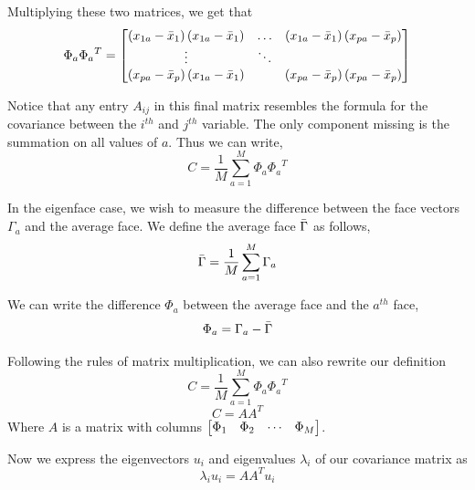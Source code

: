 \documentclass[12pt]{report}
\begin{document}
\begin{myproof}
                Multiplying these two matrices, we get that
                    \[
                        \Phi_a {\Phi_a}^T = \begin{bmatrix}
                            \left(x_{1a} - \bar{x}_1\right)\left(x_{1a} - \bar{x}_1\right) & \dotsc & \left(x_{1a} - \bar{x}_1\right) \left(x_{pa} - \bar{x}_p\right) \\
                            \vdots & \ddots & \\
                            \left(x_{pa} - \bar{x}_p\right) \left(x_{1a} - \bar{x}_1\right) & & \left(x_{pa} - \bar{x}_p\right) \left(x_{pa} - \bar{x}_p\right)
                        \end{bmatrix}
                    \]
               
                    Notice that any entry $A_{ij}$ in this final matrix resembles the formula for the covariance between the $i^{th}$ and $j^{th}$ variable. The only component missing is the summation on all values of $a$. Thus we can write,
                    \[
                        C = \frac{1}{M} \sum_{a=1}^M \Phi_a {\Phi_a}^T
                    \]
            \end{myproof}


            In the eigenface case, we wish to measure the difference between the face vectors $\Gamma_a$ and the average face. We define the average face $\bar{\Gamma}$ as follows,
                \[
                    \bar{\Gamma} = \frac{1}{M} \sum_{a=1}^M \Gamma_a
                \]

            We can write the difference $\Phi_a$ between the average face and the $a^{th}$ face,
                \[
                    \Phi_a = \Gamma_a - \bar{\Gamma}
                \]

            
            Following the rules of matrix multiplication, we can also rewrite our definition
                \[
                    C = \frac{1}{M} \sum_{a=1}^M \Phi_a {\Phi_a}^T
                \]
                \[
                    C = AA^T
                \]
            Where $A$ is a matrix with columns $\begin{bmatrix}\Phi_1 & \Phi_2 & \cdots & \Phi_M\end{bmatrix}$.
           
            Now we express the eigenvectors $u_i$ and eigenvalues $\lambda_i$ of our covariance matrix as
                \[
                    \lambda _{i} u_{i} =AA^{T} u_{i}
                \]
\end{document}
